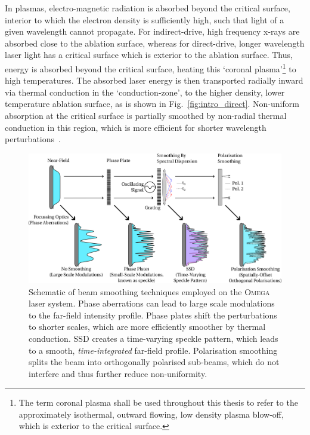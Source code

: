 In plasmas, electro-magnetic radiation is absorbed beyond the critical surface, interior to which the electron density is sufficiently high, such that light of a given wavelength cannot propagate.
For indirect-drive, high frequency x-rays are absorbed close to the ablation surface, whereas for direct-drive, longer wavelength laser light has a critical surface which is exterior to the ablation surface.
Thus, energy is absorbed beyond the critical surface, heating this `coronal plasma'\footnote{The term coronal plasma shall be used throughout this thesis to refer to the approximately isothermal, outward flowing, low density plasma blow-off, which is exterior to the critical surface.} to high temperatures.
The absorbed laser energy is then transported radially inward via thermal conduction in the `conduction-zone', to the higher density, lower temperature ablation surface, as is shown in Fig.~\ref{fig:intro_direct}.
Non-uniform absorption at the critical surface is partially smoothed by non-radial thermal conduction in this region, which is more efficient for shorter wavelength perturbations~\cite{bodner_critical_1981}.

\begin{figure}[t!]
    \includegraphics[width=\linewidth]{Introduction/Images/SmoothingOptics.png}
    \centering
    \caption{Schematic of beam smoothing techniques employed on the \textsc{Omega} laser system.
    Phase aberrations can lead to large scale modulations to the far-field intensity profile.
    Phase plates shift the perturbations to shorter scales, which are more efficiently smoother by thermal conduction.
    \ac{SSD} creates a time-varying speckle pattern, which leads to a smooth, \textit{time-integrated} far-field profile.
    Polarisation smoothing splits the beam into orthogonally polarised sub-beams, which do not interfere and thus further reduce non-uniformity.
    }%
    \label{fig:intro_SmoothingOptics}
\end{figure}

